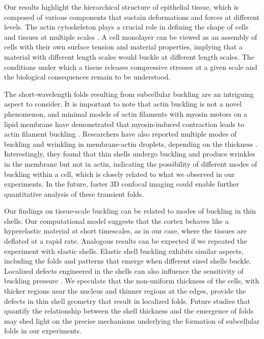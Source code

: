Our results highlight the hierarchical structure of epithelial tissue, which is composed of various components that sustain deformations and forces at different levels. The actin cytoskeleton plays a crucial role in defining the shape of cells and tissues at multiple scales \cite{clarke2021}. A cell monolayer can be viewed as an assembly of cells with their own surface tension and material properties, implying that a material with different length scales would buckle at different length scales. The conditions under which a tissue releases compressive stresses at a given scale and the biological consequences remain to be understood. 

The short-wavelength folds resulting from subcellular buckling are an intriguing aspect to consider. It is important to note that actin buckling is not a novel phenomenon, and minimal models of actin filaments with myosin motors on a lipid membrane have demonstrated that myosin-induced contraction leads to actin filament buckling \cite{murrell2012, costa2002,  wang2019}. Researchers have also reported multiple modes of buckling and wrinkling in membrane-actin droplets, depending on the thickness \cite{kusters2019}. Interestingly, they found that thin shells undergo buckling and produce wrinkles in the membrane but not in actin, indicating the possibility of different modes of buckling within a cell, which is closely related to what we observed in our experiments. In the future, faster 3D confocal imaging could enable further quantitative analysis of these transient folds.

Our findings on tissue-scale buckling can be related to modes of buckling in thin shells. Our computational model suggests that the cortex behaves like a hyperelastic material at short timescales, as in our case, where the tissues are deflated at a rapid rate. Analogous results can be expected if we repeated the experiment with elastic shells. Elastic shell buckling exhibits similar aspects, including the folds and patterns that emerge when different sized shells buckle. Localized defects engineered in the shells can also influence the sensitivity of buckling pressure \cite{lee2016a}. We speculate that the non-uniform thickness of the cells, with thicker regions near the nucleus and thinner regions at the edges, provide the defects in thin shell geometry that result in localized folds. Future studies that quantify the relationship between the shell thickness and the emergence of folds may shed light on the precise mechanisms underlying the formation of subcellular folds in our experiments.

